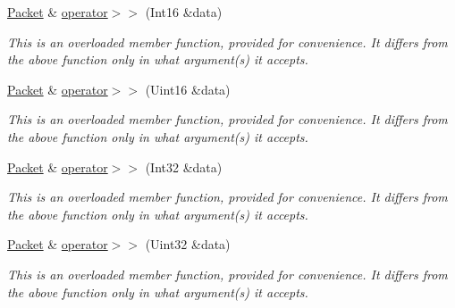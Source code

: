 \begin{DoxyCompactItemize}
\mbox{\label{classsf_1_1_packet_af82d6c4e6d74f2ca39732c1e29f30781}} 
\mbox{\hyperlink{classsf_1_1_packet}{Packet}} \& \mbox{\hyperlink{classsf_1_1_packet_af82d6c4e6d74f2ca39732c1e29f30781}{operator$>$$>$}} (Int16 \&data)
\begin{DoxyCompactList}\small\item\em This is an overloaded member function, provided for convenience. It differs from the above function only in what argument(s) it accepts. \end{DoxyCompactList}\item 
\mbox{\label{classsf_1_1_packet_afd8706f092bc830ebb438aeee9271647}} 
\mbox{\hyperlink{classsf_1_1_packet}{Packet}} \& \mbox{\hyperlink{classsf_1_1_packet_afd8706f092bc830ebb438aeee9271647}{operator$>$$>$}} (Uint16 \&data)
\begin{DoxyCompactList}\small\item\em This is an overloaded member function, provided for convenience. It differs from the above function only in what argument(s) it accepts. \end{DoxyCompactList}\item 
\mbox{\label{classsf_1_1_packet_ae7b44e79f12d500b63f5dc2a10d78d8c}} 
\mbox{\hyperlink{classsf_1_1_packet}{Packet}} \& \mbox{\hyperlink{classsf_1_1_packet_ae7b44e79f12d500b63f5dc2a10d78d8c}{operator$>$$>$}} (Int32 \&data)
\begin{DoxyCompactList}\small\item\em This is an overloaded member function, provided for convenience. It differs from the above function only in what argument(s) it accepts. \end{DoxyCompactList}\item 
\mbox{\label{classsf_1_1_packet_a4b57e1953db5bec39a851929df9a339a}} 
\mbox{\hyperlink{classsf_1_1_packet}{Packet}} \& \mbox{\hyperlink{classsf_1_1_packet_a4b57e1953db5bec39a851929df9a339a}{operator$>$$>$}} (Uint32 \&data)
\begin{DoxyCompactList}\small\item\em This is an overloaded member function, provided for convenience. It differs from the above function only in what argument(s) it accepts. \end{DoxyCompactList}\item 

\end{DoxyCompactItemize}
